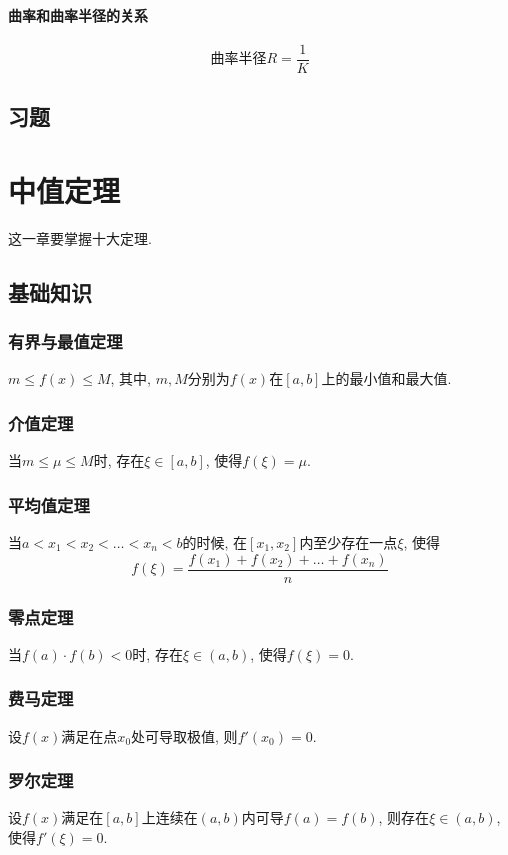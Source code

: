 \subsubsection{曲率和曲率半径的关系}
\begin{equation*}
\text{曲率半径}R=\frac{1}{K}
\end{equation*}
\section{习题}
\chapter{中值定理}
这一章要掌握十大定理.
\section{基础知识}
\subsection{有界与最值定理}
$ m\le f(x)\le M $, 其中, $ m,M $分别为$ f(x) $在$ [a,b] $上的最小值和最大值.
\subsection{介值定理}
当$ m\le \mu\le M $时, 存在$ \xi\in [a,b] $, 使得$ f(\xi)=\mu $.
\subsection{平均值定理}
当$ a<x_{1}<x_{2}<\dots<x_{n}<b $的时候, 在$ [x_{1},x_{2}] $内至少存在一点$ \xi $, 使得
\begin{equation*}
f(\xi)=\frac{f(x_{1})+f(x_{2})+\dots+f(x_{n})}{n}
\end{equation*}
\subsection{零点定理}
当$ f(a)\cdot f(b)<0 $时, 存在$\xi\in (a,b) $, 使得$ f(\xi)=0 $.
\subsection{费马定理}
设$ f(x) $满足在点$ x_{0} $处可导取极值, 则$ f'(x_{0})=0 $.
\subsection{罗尔定理}
设$ f(x) $满足在$ [a,b] $上连续在$ (a,b) $内可导$ f(a)=f(b) $, 则存在$ \xi\in(a,b) $, 使得$ f'(\xi)=0 $.

